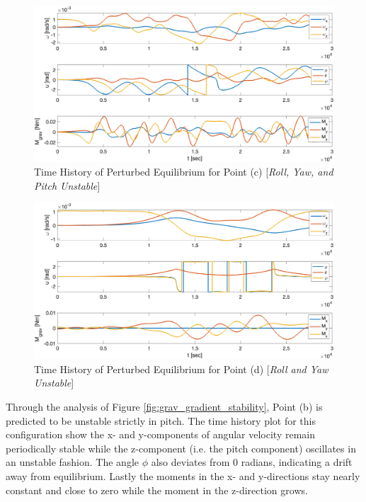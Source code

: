 \begin{figure}[H]
    \centering
    \captionsetup{justification = centering}
    \includegraphics[width = 12cm]{Images/PS5/point_c_grav_stability.png}
    \caption{Time History of Perturbed Equilibrium for Point (c) [\emph{Roll, Yaw, and Pitch Unstable}]}
    \label{fig:point_c_grav_stability}
\end{figure}

\begin{figure}[H]
    \centering
    \captionsetup{justification = centering}
    \includegraphics[width = 12cm]{Images/PS5/point_d_grav_stability.png}
    \caption{Time History of Perturbed Equilibrium for Point (d) [\emph{Roll and Yaw Unstable}]}
    \label{fig:point_d_grav_stability}
\end{figure}

Through the analysis of Figure \ref{fig:grav_gradient_stability}, Point (b) is predicted to be unstable strictly in pitch. The time history plot for this configuration show the x- and y-components of angular velocity remain periodically stable while the z-component (i.e. the pitch component) oscillates in an unstable fashion. The angle $\phi$ also deviates from 0 radians, indicating a drift away from equilibrium. Lastly the moments in the x- and y-directions stay nearly constant and close to zero while the moment in the z-direction grows.

